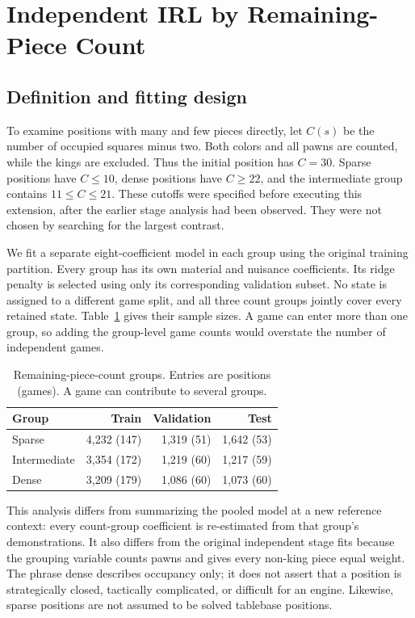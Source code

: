 \section{Independent IRL by Remaining-Piece Count}
\subsection{Definition and fitting design}
To examine positions with many and few pieces directly, let $C(s)$ be the number of occupied squares minus two. Both colors and all pawns are counted, while the kings are excluded. Thus the initial position has $C=30$. Sparse positions have $C\leq10$, dense positions have $C\geq22$, and the intermediate group contains $11\leq C\leq21$. These cutoffs were specified before executing this extension, after the earlier stage analysis had been observed. They were not chosen by searching for the largest contrast.

We fit a separate eight-coefficient model in each group using the original training partition. Every group has its own material and nuisance coefficients. Its ridge penalty is selected using only its corresponding validation subset. No state is assigned to a different game split, and all three count groups jointly cover every retained state. Table~\ref{tab:countcoverage} gives their sample sizes. A game can enter more than one group, so adding the group-level game counts would overstate the number of independent games.
\begin{table}[t]\centering
\small
\caption{Remaining-piece-count groups. Entries are positions (games). A game can contribute to several groups.}\label{tab:countcoverage}
\begin{tabular}{lrrr}
\toprule
Group & Train & Validation & Test\\\midrule
Sparse & 4,232 (147) & 1,319 (51) & 1,642 (53)\\
Intermediate & 3,354 (172) & 1,219 (60) & 1,217 (59)\\
Dense & 3,209 (179) & 1,086 (60) & 1,073 (60)\\
\bottomrule\end{tabular}\end{table}

This analysis differs from summarizing the pooled model at a new reference context: every count-group coefficient is re-estimated from that group's demonstrations. It also differs from the original independent stage fits because the grouping variable counts pawns and gives every non-king piece equal weight. The phrase dense describes occupancy only; it does not assert that a position is strategically closed, tactically complicated, or difficult for an engine. Likewise, sparse positions are not assumed to be solved tablebase positions.

